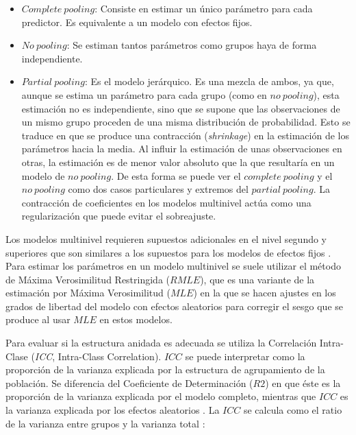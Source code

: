 \documentclass[
  12pt,
  a4paper,
  extrafontsizes,
  onecolumn,
  openright,
  table]{memoir}
\providecommand{\tightlist}{%
  \setlength{\itemsep}{0pt}\setlength{\parskip}{0pt}}\usepackage{longtable,booktabs,array}
\newlength{\rf}
\begin{document}
\begin{itemize}
\tightlist
\item
  \(Complete\ pooling\): Consiste en estimar un único parámetro para
  cada predictor. Es equivalente a un modelo con efectos fijos.
\item
  \(No\ pooling\): Se estiman tantos parámetros como grupos haya de
  forma independiente.
\item
  \(Partial\ pooling\): Es el modelo jerárquico. Es una mezcla de ambos,
  ya que, aunque se estima un parámetro para cada grupo (como en
  \(no\ pooling\)), esta estimación no es independiente, sino que se
  supone que las observaciones de un mismo grupo proceden de una misma
  distribución de probabilidad. Esto se traduce en que se produce una
  contracción (\emph{\gls{shrinkage}}) en la estimación de los
  parámetros hacia la media. Al influir la estimación de unas
  observaciones en otras, la estimación es de menor valor absoluto que
  la que resultaría en un modelo de \(no\ pooling\). De esta forma se
  puede ver el \(complete\ pooling\) y el \(no\ pooling\) como dos casos
  particulares y extremos del \(partial\ pooling\). La contracción de
  coeficientes en los modelos multinivel actúa como una regularización
  que puede evitar el sobreajuste.
\end{itemize}

Los modelos multinivel requieren supuestos adicionales en el nivel
segundo y superiores que son similares a los supuestos para los modelos
de efectos fijos \autocite[ver][p.~43]{chen2021}. Para estimar los
parámetros en un modelo multinivel se suele utilizar el método de Máxima
Verosimilitud Restringida (\(RMLE\)), que es una variante de la
estimación por Máxima Verosimilitud (\(MLE\)) en la que se hacen ajustes
en los grados de libertad del modelo con efectos aleatorios para
corregir el sesgo que se produce al usar \(MLE\) en estos modelos.

Para evaluar si la estructura anidada es adecuada se utiliza la
Correlación Intra-Clase (\emph{\gls{ICC}}, Intra-Class Correlation).
\(ICC\) se puede interpretar como la proporción de la varianza explicada
por la estructura de agrupamiento de la población. Se diferencia del
Coeficiente de Determinación (\(R2\)) en que éste es la proporción de la
varianza explicada por el modelo completo, mientras que \(ICC\) es la
varianza explicada por los efectos aleatorios
\autocite[ver][]{performance}. La \(ICC\) se calcula como el ratio de la
varianza entre grupos y la varianza total
\autocite[ver][pp.~29-33]{chen2021}:
\end{document}
